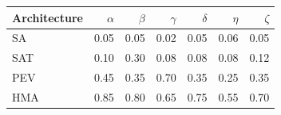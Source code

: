 \begin{tabular}{lrrrrrr}
\toprule
Architecture & $\alpha$ & $\beta$ & $\gamma$ & $\delta$ & $\eta$ & $\zeta$ \\
\midrule
SA & 0.05 & 0.05 & 0.02 & 0.05 & 0.06 & 0.05 \\
SAT & 0.10 & 0.30 & 0.08 & 0.08 & 0.08 & 0.12 \\
PEV & 0.45 & 0.35 & 0.70 & 0.35 & 0.25 & 0.35 \\
HMA & 0.85 & 0.80 & 0.65 & 0.75 & 0.55 & 0.70 \\
\bottomrule
\end{tabular}
